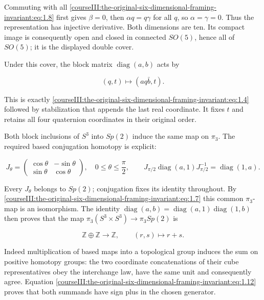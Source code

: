 Commuting with all \eqref{courseIII:the-original-six-dimensional-framing-invariant:eq:1.8} first gives \(\beta=0\), then \(\alpha q=q\gamma\) for all \(q\), so \(\alpha=\gamma=0\). Thus the representation has injective derivative. Both dimensions are ten. Its compact image is consequently open and closed in connected \(SO(5)\), hence all of \(SO(5)\); it is the displayed double cover.

Under this cover, the block matrix \(\operatorname{diag}(a,b)\) acts by

\begin{equation}
(q,t)\longmapsto(aq\bar b,t).
 \label{courseIII:the-original-six-dimensional-framing-invariant:eq:1.11}
\end{equation}

This is exactly \eqref{courseIII:the-original-six-dimensional-framing-invariant:eq:1.4} followed by stabilization that appends the last real coordinate. It fixes \(t\) and retains all four quaternion coordinates in their original order.

Both block inclusions of \(S^3\) into \(Sp(2)\) induce the same map on \(\pi_3\). The required based conjugation homotopy is explicit:

\begin{equation}
J_\theta=
 \begin{pmatrix}\cos\theta&-\sin\theta\\
                 \sin\theta&\cos\theta\end{pmatrix},
 \quad0\leq\theta\leq\frac{\pi}{2},\qquad
 J_{\pi/2}\operatorname{diag}(a,1)J_{\pi/2}^{-1}
        =\operatorname{diag}(1,a).
 \label{courseIII:the-original-six-dimensional-framing-invariant:eq:1.12}
\end{equation}

Every \(J_\theta\) belongs to \(Sp(2)\); conjugation fixes its identity throughout. By \eqref{courseIII:the-original-six-dimensional-framing-invariant:eq:1.7} this common \(\pi_3\)-map is an isomorphism. The identity
\(\operatorname{diag}(a,b)=\operatorname{diag}(a,1)\operatorname{diag}(1,b)\)
then proves that the map
\(\pi_3(S^3\times S^3)\to\pi_3Sp(2)\)
is

\begin{equation}
\mathbb Z\oplus\mathbb Z\longrightarrow\mathbb Z,
 \qquad (r,s)\longmapsto r+s.
 \label{courseIII:the-original-six-dimensional-framing-invariant:eq:1.13}
\end{equation}

Indeed multiplication of based maps into a topological group induces the sum on positive homotopy groups: the two coordinate concatenations of their cube representatives obey the interchange law, have the same unit and consequently agree. Equation \eqref{courseIII:the-original-six-dimensional-framing-invariant:eq:1.12} proves that both summands have sign plus in the chosen generator.

